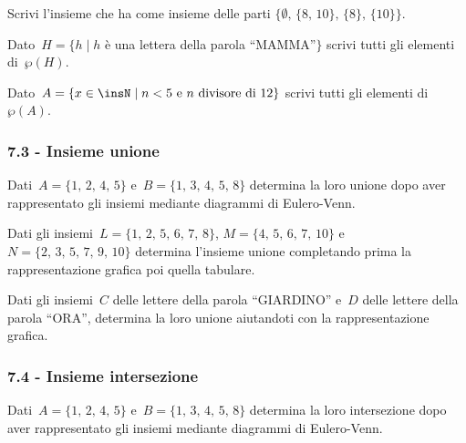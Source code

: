 \begin{esercizio}
 \label{ese:7.4}
 Scrivi l'insieme che ha come insieme delle parti
$\{\emptyset\text{, }\{\text{8, 10}\}\text{, }\{8\}\text{, }\{10\}\}$.
\end{esercizio}

\begin{esercizio}
 \label{ese:7.5}
Dato~$H=\{h\mid h$ è una lettera della parola ``MAMMA''$\}$ scrivi
tutti gli elementi di~$\wp (H)$.
\end{esercizio}

\begin{esercizio}
 \label{ese:7.6}
 Dato~$A=\{x\in\insN\mid n<5\text{ e }n\text{ divisore di~12}\}$ scrivi tutti gli elementi di
$\wp (A)$.
\end{esercizio}

\subsubsection*{7.3 - Insieme unione}
\begin{esercizio}
 \label{ese:7.7}
Dati~$A=\{\text{1, 2, 4, 5}\}$ e~$B=\{\text{1, 3, 4, 5, 8}\}$ determina la loro unione dopo
aver rappresentato gli insiemi mediante diagrammi di Eulero-Venn.
 \end{esercizio}

\begin{esercizio}
 \label{ese:7.8}
 Dati gli insiemi~$L=\{\text{1, 2, 5, 6, 7, 8}\}$, $M=\{\text{4, 5, 6, 7, 10}\}$ e~$N=\{\text{2, 3, 5, 7, 9, 10}\}$
determina l'insieme unione completando prima la rappresentazione
grafica poi quella tabulare.
\begin{center}
 
\end{center}
\end{esercizio}

\begin{esercizio}
 \label{ese:7.9}
Dati gli insiemi~$C$ delle lettere della parola ``GIARDINO'' e~$D$ delle lettere della
parola ``ORA'', determina la loro unione aiutandoti con la rappresentazione grafica.
 \end{esercizio}

\subsubsection*{7.4 - Insieme intersezione}
 \begin{esercizio}
 \label{ese:7.10}
Dati~$A=\{\text{1, 2, 4, 5}\}$ e~$B=\{\text{1, 3, 4, 5, 8}\}$ determina la loro
intersezione dopo aver rappresentato gli insiemi mediante diagrammi di
Eulero-Venn.
\end{esercizio}

